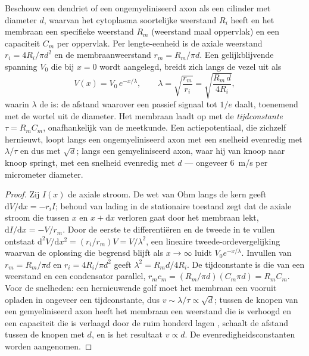 \begin{theorem}\label{thm:b3:nervous-systems:cable}
Beschouw een dendriet of een ongemyeliniseerd axon als een cilinder met
diameter $d$, waarvan het cytoplasma soortelijke weerstand $R_{i}$
heeft en het membraan een specifieke weerstand $R_{m}$ (weerstand maal
oppervlak) en een capaciteit $C_{m}$ per oppervlak. Per lengte-eenheid
is de axiale weerstand $r_{i} = 4R_{i}/\pi d^{2}$
en de membraanweerstand $r_{m} = R_{m}/\pi d$. Een gelijkblijvende
spanning $V_{0}$ die bij $x = 0$ wordt aangelegd, breidt zich langs de
vezel uit als
\[
V(x) = V_{0}\,e^{-x/\lambda}, \qquad
\lambda = \sqrt{\frac{r_{m}}{r_{i}}} = \sqrt{\frac{R_{m}\,d}{4R_{i}}},
\]
waarin $\lambda$ de \emph{} is: de afstand waarover een
passief signaal tot $1/e$ daalt, toenemend met de wortel uit de
diameter. Het membraan laadt op met de \emph{tijdconstante} $\tau =
R_{m}C_{m}$, onafhankelijk van de meetkunde. Een actiepotentiaal, die
zichzelf hernieuwt, loopt langs een ongemyeliniseerd axon met een
snelheid evenredig met $\lambda/\tau$ en dus met $\sqrt{d}$; langs een
gemyeliniseerd axon, waar hij van knoop naar knoop springt, met een
snelheid evenredig met $d$ --- ongeveer \qty{6}{m/s} per micrometer
diameter.
\end{theorem}
\begin{proof}
Zij $I(x)$ de axiale stroom. De wet van Ohm langs de kern geeft
$\mathrm{d}V/\mathrm{d}x = -r_{i}I$; behoud van lading in de
stationaire toestand zegt dat de axiale stroom die tussen $x$ en $x + \mathrm{d}x$
verloren gaat door het membraan lekt, $\mathrm{d}I/\mathrm{d}x = -V/r_{m}$.
Door de eerste te differentiëren en de tweede in te vullen ontstaat
$\mathrm{d}^{2}V/\mathrm{d}x^{2} = (r_{i}/r_{m})V = V/\lambda^{2}$, een
lineaire tweede-ordevergelijking waarvan de oplossing die begrensd blijft als $x \to \infty$ luidt
$V_{0}e^{-x/\lambda}$. Invullen van $r_{m} = R_{m}/\pi d$ en $r_{i} =
4R_{i}/\pi d^{2}$ geeft $\lambda^{2} = R_{m}d/4R_{i}$. De tijdconstante
is die van een weerstand en een condensator parallel, $r_{m}c_{m} =
(R_{m}/\pi d)(C_{m}\pi d) = R_{m}C_{m}$. Voor de snelheden: een
hernieuwende golf moet het membraan een  vooruit opladen
in ongeveer een tijdconstante, dus $v \sim \lambda/\tau \propto \sqrt{d}$;
tussen de knopen van een gemyeliniseerd axon heeft het membraan een
weerstand die is verhoogd en een capaciteit die is verlaagd door de ruim
honderd lagen , schaalt de afstand tussen de knopen met $d$, en is het resultaat
$v \propto d$. De evenredigheidsconstanten worden aangenomen.
\end{proof}

